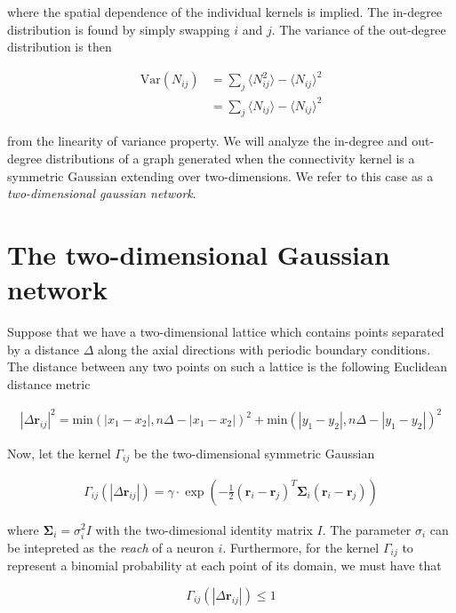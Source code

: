 \documentclass{ucetd}
\begin{document}
where the spatial dependence of the individual kernels is implied. The in-degree distribution is found by simply swapping $i$ and $j$. The variance of the out-degree distribution is then

\begin{align}
\mathrm{Var}(N_{ij}) &= \sum_{j} \langle N_{ij}^{2} \rangle - \langle N_{ij} \rangle ^{2} \\
&= \sum_{j} \langle N_{ij}\rangle - \langle N_{ij} \rangle ^{2} 
\end{align}

from the linearity of variance property. We will analyze the in-degree and out-degree distributions of a graph generated when the connectivity kernel is a symmetric Gaussian extending over two-dimensions. We refer to this case as a \emph{two-dimensional gaussian network}.


\section{The two-dimensional Gaussian network}

Suppose that we have a two-dimensional lattice which contains points separated by a distance $\Delta$ along the axial directions with periodic boundary conditions. The distance between any two points on such a lattice is the following Euclidean distance metric

\begin{align*}
|\Delta\mathbf{r}_{ij}|^{2} = \mathrm{min}(|x_1 - x_2|, n\Delta - |x_1 - x_2|)^2 + \mathrm{min}(|y_1 - y_2|, n\Delta - |y_1 - y_2|)^2
\end{align*}

Now, let the kernel $\Gamma_{ij}$ be the two-dimensional symmetric Gaussian

\begin{align}
\Gamma_{ij}(|\Delta\mathbf{r}_{ij}|) = \gamma\cdot \exp\left(-\frac{1}{2}(\mathbf{r}_{i}-\mathbf{r}_{j})^{T}\mathbf{\Sigma}_{i}(\mathbf{r}_{i}-\mathbf{r}_{j})\right)
\end{align}

where $\mathbf{\Sigma}_{i} = \sigma_{i}^{2}I$ with the two-dimesional identity matrix $I$. The parameter $\sigma_{i}$ can be intepreted as the \emph{reach} of a neuron $i$. Furthermore, for the kernel $\Gamma_{ij}$ to represent a binomial probability at each point of its domain, we must have that


\begin{equation}
\Gamma_{ij}(|\Delta\mathbf{r}_{ij}|)  \leq 1
\end{equation}
\end{document}

